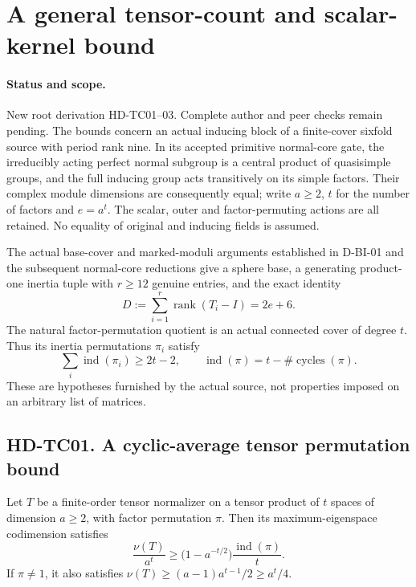 \section{A general tensor-count and scalar-kernel bound}
\label{sec:tensor-count-scalar-bound}

\paragraph{Status and scope.}
New root derivation HD-TC01--03. Complete author and peer checks
remain pending. The bounds concern an actual inducing block of
a finite-cover sixfold source with period rank nine. In its
accepted primitive normal-core gate, the irreducibly acting
perfect normal subgroup is a central product of quasisimple
groups, and the full inducing group acts transitively on its
simple factors. Their complex module dimensions are consequently
equal; write $a\ge2$, $t$ for the number of factors and $e=a^t$.
The scalar, outer and factor-permuting actions are all retained.
No equality of original and inducing fields is assumed.

The actual base-cover and marked-moduli arguments established in
D-BI-01 and the subsequent normal-core reductions give a sphere
base, a generating product-one inertia tuple with $r\ge12$
genuine entries, and the exact identity
\[
              D:=\sum_{i=1}^r\operatorname{rank}(T_i-I)
                           =2e+6.                       \tag{TC.1}
\]
The natural factor-permutation quotient is an actual connected
cover of degree $t$. Thus its inertia permutations $\pi_i$ satisfy
\[
          \sum_i\operatorname{ind}(\pi_i)\ge2t-2,
 \qquad\operatorname{ind}(\pi)=t-\#\operatorname{cycles}(\pi).
                                                               \tag{TC.2}
\]
These are hypotheses furnished by the actual source, not
properties imposed on an arbitrary list of matrices.

\subsection*{HD-TC01. A cyclic-average tensor permutation bound}

\begin{lemma}[HD-TC01]
Let $T$ be a finite-order tensor normalizer on a tensor product
of $t$ spaces of dimension $a\ge2$, with factor permutation $\pi$.
Then its maximum-eigenspace codimension satisfies
\[
 \frac{\nu(T)}{a^t}\ge
       \bigl(1-a^{-t/2}\bigr)\frac{\operatorname{ind}(\pi)}t.
                                                               \tag{TC.3}
\]
If $\pi\ne1$, it also satisfies
$\nu(T)\ge(a-1)a^{t-1}/2\ge a^t/4$.
\end{lemma}

